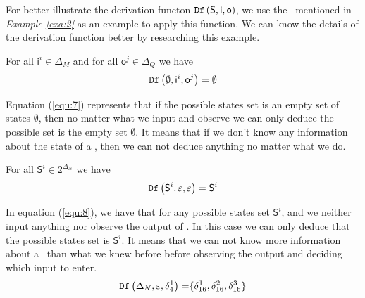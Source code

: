 \begin{example}
 For better illustrate the derivation functon ${\tt Df}\left( \mathsf{S},  \mathsf{i},  \mathsf{o}\right)$, we use the \BCN\ mentioned in {\em Example \ref{exa:2}} as an example to apply this function. We can know the details of the derivation function better by researching this example.
 
 For all $\mathsf{i}^{i}\in \Delta_M$ and for all $\mathsf{o}^{j}\in \Delta_Q$ we have 
\begin{equation}
\begin{split}
{\tt Df}\left(\emptyset,\mathsf{i}^{i},\mathsf{o}^{j}\right)=\emptyset\\
\end{split}
\label{equ:7}
\end{equation}

Equation (\ref{equ:7}) represents that if the possible states set is an empty set of states $\emptyset$, then no matter what we input and observe we can only deduce the possible set is the empty set $\emptyset$. It means that if we don't know any information about the state of a \BCN, then we can not deduce anything no matter what we do.

For all $\mathsf{S}^{i}\in 2^{\Delta_N}$ we have 
\begin{equation}
\begin{split}
{\tt Df}\left(\mathsf{S}^{i},\varepsilon,\varepsilon\right)=\mathsf{S}^{i}\\
\end{split}
\label{equ:8}
\end{equation}

 In equation (\ref{equ:8}), we have that for any possible states set $\mathsf{S}^{i}$, and we neither input anything nor observe the output of \BCN. In this case we can only deduce that the possible states set is $\mathsf{S}^{i}$. It means that we can not know more information about a \BCN\ than what we knew before before observing the output and deciding which input to enter.
\begin{equation}
\begin{split}
{\tt Df}\left(\Delta_N,\varepsilon,\delta_4^1\right)=&\{\delta_{16}^1,\delta_{16}^2,\delta_{16}^3\}\\
\end{split}
\label{equ:9}
\end{equation}
 

\end{example}
